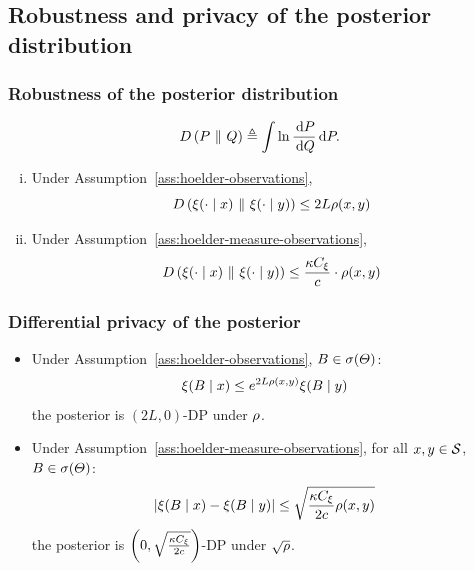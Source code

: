 \subsection{Robustness and privacy of the posterior distribution}
\label{sec:robustness}
\begin{frame}
  \frametitle{Robustness of the posterior distribution}
  \begin{definition}[KL divergence]
    \begin{equation}
      \label{eq:kl-divergence}
      D\left(P ~\middle\|~ Q\right) \mathrel{\triangleq} \int \ln \frac{\,\mathrm{d}{P}}{\,\mathrm{d}{Q}} \,\mathrm{d}{P}.
    \end{equation}
  \end{definition}
  \begin{theorem}
    \begin{enumerate}[(i)]
    \item<2-> Under Assumption~\ref{ass:hoelder-observations},
      \begin{equation}
        D\left(\xi(\cdot \mid x) ~\middle\|~ \xi(\cdot \mid y)\right)
        \leq
        2L\rho(x, y)
      \end{equation}
      \label{the:kl-1}
    \item<3-> Under Assumption~\ref{ass:hoelder-measure-observations},
      \begin{equation}
        D\left(\xi(\cdot \mid x) ~\middle\|~ \xi(\cdot \mid y)\right)
        \leq
        \frac{\kappa C_\xi }{c} \cdot 
        \rho(x, y)
      \end{equation}
      \label{the:kl-2}
    \end{enumerate}
    \label{the:kl}
  \end{theorem}
\end{frame}

\begin{frame}
  \frametitle{Differential privacy of the posterior}
  \begin{block}
    \begin{itemize}
    \item<1-> Under Assumption~\ref{ass:hoelder-observations}, 
      $B \in \sigma(\Theta)$:
      \begin{align}
        \xi(B \mid x) & \leq e^{ 2L \rho(x, y)} \xi(B \mid y) 
      \end{align}
      \ie the posterior is $(2L, 0)$-DP under $\rho$.
      \label{thm:dp1}
    \item<2-> Under Assumption~\ref{ass:hoelder-measure-observations}, for
      all $x,y \in \mathcal{{\mathcal{S}}}$, $B \in \sigma(\Theta)$:
      \begin{align*}
        \left|\xi(B \mid x) - \xi(B \mid y)\right|
        & \leq \sqrt{\frac{\kappa C_\xi }{2c} \rho(x, y)}
      \end{align*}
      \ie the posterior is $\left(0,  \sqrt{\frac{\kappa C_\xi }{2c}}\right)$-DP under $\sqrt{\rho}$.
      \label{thm:dp2}
    \end{itemize}
    \label{thm:dp}
  \end{block}
\end{frame}


